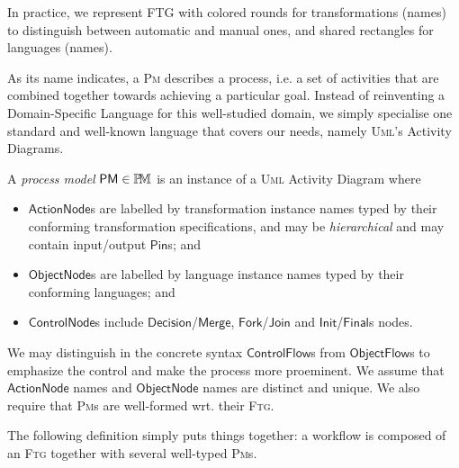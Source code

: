 In practice, we represent \textsf{FTG} with colored rounds for transformations 
(names) to distinguish between automatic and manual ones, and shared rectangles 
for languages (names).

\medskip
As its name indicates, a \textsc{Pm} describes a process, i.e. a set of 
activities that are combined together towards achieving a particular goal. 
Instead of reinventing a Domain-Specific Language for this well-studied domain, 
we simply specialise one standard and well-known language that covers our 
needs, namely \textsc{Uml}'s Activity Diagrams.


\begin{Definition}
   A \emph{process model} $\mathsf{PM}\in\mathbb{P}\!\mathbb{M}$ is an instance of a 
\textsc{Uml} Activity Diagram where 
\begin{itemize}
   \item $\mathsf{ActionNode}$s are labelled by transformation instance names 
typed by their conforming transformation specifications, and may be 
\emph{hierarchical} and may contain input/output $\mathsf{Pin}$s; and 
   \item $\mathsf{ObjectNode}$s are labelled by language instance names typed 
by their conforming languages; and 
   \item $\mathsf{ControlNode}$s include 
$\mathsf{Decision}$/$\mathsf{Merge}$, $\mathsf{Fork}$/$\mathsf{Join}$ and 
$\mathsf{Init}$/$\mathsf{Final}$s nodes.   
\end{itemize}
\end{Definition}
We may distinguish in the concrete syntax $\mathsf{ControlFlow}$s from 
$\mathsf{ObjectFlow}$s to emphasize the control and make the process more 
proeminent. We assume that $\mathsf{ActionNode}$ names and 
$\mathsf{ObjectNode}$ names are distinct and unique. We also require that 
\textsc{Pm}s are well-formed wrt. their \textsc{Ftg}.

\medskip
{}

\medskip
The following definition simply puts things together: a workflow is composed of 
an \textsc{Ftg} together with several well-typed \textsc{Pm}s. 

